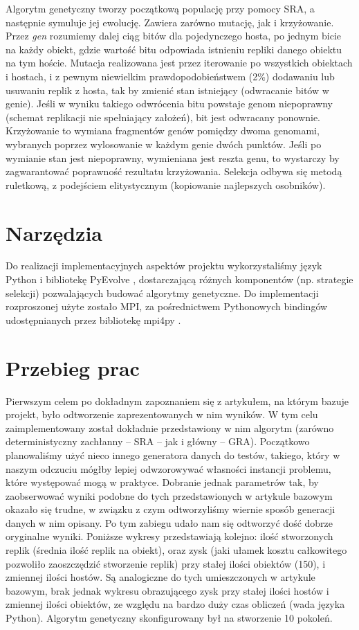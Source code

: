\documentclass[11pt,pdftex,a4paper]{scrartcl}
\begin{document}
Algorytm genetyczny tworzy początkową populację przy pomocy SRA, a następnie symuluje jej ewolucję.
Zawiera zarówno mutację, jak i krzyżowanie. Przez \emph{gen} rozumiemy dalej ciąg bitów dla 
pojedynczego hosta, po jednym bicie na każdy obiekt, gdzie wartość bitu odpowiada istnieniu repliki
danego obiektu na tym hoście. Mutacja realizowana jest przez iterowanie po wszystkich obiektach 
i hostach, i z pewnym niewielkim prawdopodobieństwem (2\%) dodawaniu lub usuwaniu replik z hosta, 
tak by zmienić stan istniejący (odwracanie bitów w genie). Jeśli w wyniku takiego odwrócenia bitu
powstaje genom niepoprawny (schemat replikacji nie spełniający założeń), bit jest odwracany ponownie. 
Krzyżowanie to wymiana fragmentów genów pomiędzy dwoma genomami, wybranych poprzez wylosowanie w 
każdym genie dwóch punktów. Jeśli po wymianie stan jest niepoprawny, wymieniana jest reszta genu,
to wystarczy by zagwarantować poprawność rezultatu krzyżowania. Selekcja odbywa się metodą ruletkową,
z podejściem elitystycznym (kopiowanie najlepszych osobników).

\section{Narzędzia}
Do realizacji implementacyjnych aspektów projektu wykorzystaliśmy język Python i bibliotekę
PyEvolve \cite{pyevolve}, dostarczającą różnych komponentów (np. strategie selekcji) pozwalających
budować algorytmy genetyczne. Do implementacji rozproszonej użyte zostało MPI, za pośrednictwem
Pythonowych bindingów udostępnianych przez bibliotekę mpi4py \cite{mpi4py}.

\section{Przebieg prac}
Pierwszym celem po dokładnym zapoznaniem się z artykułem, na którym bazuje projekt, było odtworzenie
zaprezentowanych w nim wyników. W tym celu zaimplementowany został dokładnie przedstawiony w nim
algorytm (zarówno deterministyczny zachłanny -- SRA -- jak i główny -- GRA). Początkowo planowaliśmy
użyć nieco innego generatora danych do testów, takiego, który w naszym odczuciu mógłby lepiej
odwzorowywać własności instancji problemu, które występować mogą w praktyce. Dobranie jednak parametrów
tak, by zaobserwować wyniki podobne do tych przedstawionych w artykule bazowym okazało się trudne,
w związku z czym odtworzyliśmy wiernie sposób generacji danych w nim opisany. Po tym zabiegu
udało nam się odtworzyć dość dobrze oryginalne wyniki. Poniższe wykresy przedstawiają kolejno: ilość 
stworzonych replik (średnia ilość replik na obiekt), oraz zysk (jaki ułamek kosztu całkowitego
pozwoliło zaoszczędzić stworzenie replik) przy stałej ilości obiektów (150), i zmiennej ilości
hostów. Są analogiczne do tych umieszczonych w artykule bazowym, brak jednak wykresu obrazującego
zysk przy stałej ilości hostów i zmiennej ilości obiektów, ze względu na bardzo duży czas obliczeń
(wada języka Python). Algorytm genetyczny skonfigurowany był na stworzenie 10 pokoleń.
\end{document}
